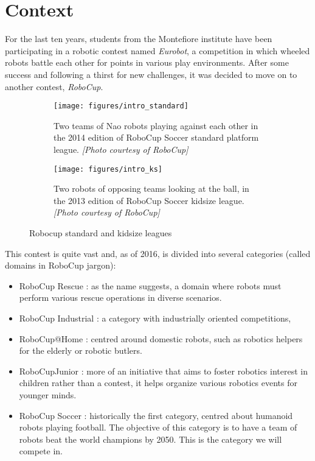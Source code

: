 \section{Context}
For the last ten years, students from the Montefiore institute have been participating in a robotic contest named \emph{Eurobot}, a competition in which wheeled robots battle each other for points in various play environments. After some success and following a thirst for new challenges, it was decided to move on to another contest, \emph{RoboCup}.

\begin{figure}[htp]
\center
\begin{subfigure}[b]{0.45\textwidth}
\texttt{[image: figures/intro\_standard]}
\caption[RoboCup Soccer standard platform]{Two teams of Nao robots playing against each other in the 2014 edition of RoboCup Soccer standard platform league. \textit{[Photo courtesy of RoboCup]}}
\label{fig:intro_standard}
\end{subfigure}
\hfill
\begin{subfigure}[b]{0.45\textwidth}
\texttt{[image: figures/intro\_ks]}
\caption[RoboCup Soccer standard platform]{Two robots of opposing teams looking at the ball, in the 2013 edition of RoboCup Soccer kidsize league. \textit{[Photo courtesy of RoboCup]}}
\label{fig:intro_ks}
\end{subfigure}
\caption[RoboCup standard and kidsize leagues]{Robocup standard and kidsize leagues}
\label{fig:intro_robocup}
\end{figure}

This contest is quite vast and, as of 2016, is divided into several categories (called domains in RoboCup jargon):
\begin{itemize}
\item RoboCup Rescue : as the name suggests, a domain where robots must perform various rescue operations in diverse scenarios.
\item RoboCup Industrial : a category with industrially oriented competitions, 
\item RoboCup@Home : centred around domestic robots, such as robotics helpers for the elderly or robotic butlers.
\item RoboCupJunior : more of an initiative that aims to foster robotics interest in children rather than a contest, it helps organize various robotics events for younger minds.
\item RoboCup Soccer : historically the first category, centred about humanoid robots playing football. The objective of this category is to have a team of robots beat the world champions by 2050. This is the category we will compete in.
\end{itemize}

